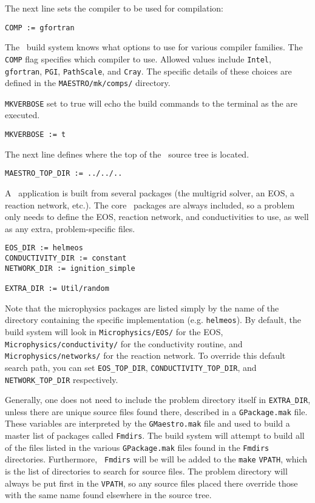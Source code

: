 The next line sets the compiler to be used for compilation:
\begin{lstlisting}[language={[gnu]make},mathescape=false]
  COMP := gfortran
\end{lstlisting}
The \maestro\ build system knows what options to use for various
compiler families.  The {\tt COMP} flag specifies which compiler to
use.  Allowed values include {\tt Intel}, {\tt gfortran}, {\tt PGI},
{\tt PathScale}, and {\tt Cray}.  The specific details of these
choices are defined in the {\tt MAESTRO/mk/comps/} directory.

{\tt MKVERBOSE} set to true will echo the build commands to the
terminal as the are executed.
\begin{lstlisting}[language={[gnu]make},mathescape=false]
  MKVERBOSE := t
\end{lstlisting}

The next line defines where the top of the \maestro\ source tree is located.
\begin{lstlisting}[language={[gnu]make},mathescape=false]
  MAESTRO_TOP_DIR := ../../..
\end{lstlisting}

A \maestro\ application is built from several packages (the
multigrid solver, an EOS, a reaction network, etc.).  The core
\maestro\ packages are always included, so a problem only needs
to define the EOS, reaction network, and conductivities to
use, as well as any extra, problem-specific files.  
\begin{lstlisting}[language={[gnu]make},mathescape=false]
EOS_DIR := helmeos   
CONDUCTIVITY_DIR := constant
NETWORK_DIR := ignition_simple

EXTRA_DIR := Util/random
\end{lstlisting}
Note that the microphysics packages are listed simply by the name of 
the directory containing the specific implementation (e.g. {\tt helmeos}).
By default, the build system will look in {\tt Microphysics/EOS/} for
the EOS, {\tt Microphysics/conductivity/} for the conductivity routine,
and {\tt Microphysics/networks/} for the reaction network.  To
override this default search path, you can set {\tt EOS\_TOP\_DIR},
{\tt CONDUCTIVITY\_TOP\_DIR}, and {\tt NETWORK\_TOP\_DIR} respectively.

Generally, one does not need to include the problem directory itself
in {\tt EXTRA\_DIR}, unless there are unique source files found there,
described in a {\tt GPackage.mak} file.  These variables are
interpreted by the {\tt GMaestro.mak} file and used to build a master
list of packages called {\tt Fmdirs}.  The build system will attempt
to build all of the files listed in the various {\tt GPackage.mak}
files found in the {\tt Fmdirs} directories.  Furthermore, {\tt
  Fmdirs} will be will be added to the {\tt make} {\tt VPATH}, which
is the list of directories to search for source files.  The problem
directory will always be put first in the {\tt VPATH}, so any source
files placed there override those with the same name found elsewhere
in the source tree.  

